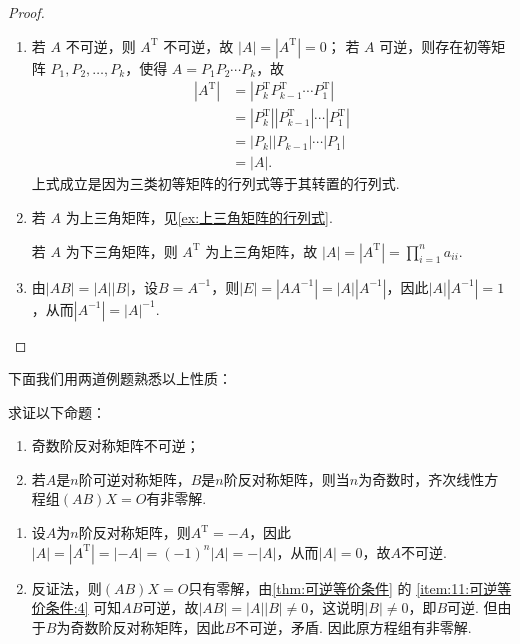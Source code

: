 \begin{proof}
\begin{enumerate}[start=2]
        \item 若 $A$ 不可逆，则 $A^\mathrm{T}$ 不可逆，故 $|A| = |A^\mathrm{T}| = 0$；
            若 $A$ 可逆，则存在初等矩阵 $P_1, P_2, \ldots, P_k$，使得 $A = P_1 P_2 \cdots P_k$，故
            \begin{align*}
                |A^\mathrm{T}| &= |P_k^\mathrm{T} P_{k-1}^\mathrm{T} \cdots P_1^\mathrm{T}| \\
                      &= |P_k^\mathrm{T}| |P_{k-1}^\mathrm{T}| \cdots |P_1^\mathrm{T}| \\
                      &= |P_k| |P_{k-1}| \cdots |P_1| \\
                      &= |A|.
            \end{align*}
            上式成立是因为三类初等矩阵的行列式等于其转置的行列式.

        \item 若 $A$ 为上三角矩阵，见\autoref{ex:上三角矩阵的行列式}.

            若 $A$ 为下三角矩阵，则 $A^\mathrm{T}$ 为上三角矩阵，故 $|A| = |A^\mathrm{T}| = \prod_{i=1}^n a_{ii}$.

        \item 由$|AB|=|A||B|$，设$B=A^{-1}$，则$|E|=|AA^{-1}|=|A||A^{-1}|$，因此$|A||A^{-1}|=1$，从而$|A^{-1}|=|A|^{-1}$.
    \end{enumerate}
\end{proof}

下面我们用两道例题熟悉以上性质：

\begin{example}{}{}
    求证以下命题：
    \begin{enumerate}
        \item 奇数阶反对称矩阵不可逆；

        \item 若$A$是$n$阶可逆对称矩阵，$B$是$n$阶反对称矩阵，则当$n$为奇数时，齐次线性方程组$(AB)X=O$有非零解.
    \end{enumerate}
\end{example}

\begin{solution}
    \begin{enumerate}
        \item 设$A$为$n$阶反对称矩阵，则$A^\mathrm{T}=-A$，因此$|A|=|A^\mathrm{T}|=|-A|=(-1)^n|A|=-|A|$，从而$|A|=0$，故$A$不可逆.
        \item 反证法，则$(AB)X=O$只有零解，由\autoref{thm:可逆等价条件} 的 \ref*{item:11:可逆等价条件:4} 可知$AB$可逆，故$|AB|=|A||B|\neq 0$，这说明$|B|\neq 0$，即$B$可逆. 但由于$B$为奇数阶反对称矩阵，因此$B$不可逆，矛盾. 因此原方程组有非零解.
    \end{enumerate}
\end{solution}

